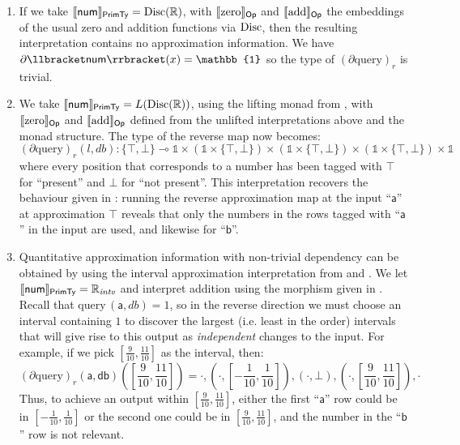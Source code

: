 \begin{enumerate}
\item If we take $\llbracket \mathsf{num} \rrbracket_{\mathsf{PrimTy}} = \mathrm{Disc}(\mathbb{R})$, with $\llbracket \mathrm{zero} \rrbracket_{\mathsf{Op}}$ and
  $\llbracket \mathrm{add} \rrbracket_{\mathsf{Op}}$ the embeddings of the usual zero and addition functions via $\mathrm{Disc}$, then the
  resulting interpretation contains no approximation information. We have
  $\partial\sem{\mathsf{num}}(x) = \mathbb{1}$ so the type of $(\partial \mathrm{query})_r$ is trivial.
\item We take $\llbracket \mathsf{num} \rrbracket_{\mathsf{PrimTy}} = L(\mathrm{Disc}(\mathbb{R}))$, using the lifting monad from
  , with $\llbracket \mathrm{zero} \rrbracket_{\mathsf{Op}}$ and
  $\llbracket \mathrm{add} \rrbracket_{\mathsf{Op}}$ defined from the unlifted interpretations above and the monad structure. The
  type of the reverse map now becomes:
  \begin{displaymath}
    (\partial \mathrm{query})_r(l, \mathit{db}) : \{\top,\bot\} \multimap \mathbb{1} \times (\mathbb{1} \times \{\top,\bot\}) \times (\mathbb{1} \times \{\top,\bot\}) \times (\mathbb{1} \times \{\top,\bot\}) \times \mathbb{1}
  \end{displaymath}
  where every position that corresponds to a number has been tagged with $\top$ for ``present'' and $\bot$ for
  ``not present''. This interpretation recovers the behaviour given in : running
  the reverse approximation map at the input ``$\mathsf{a}$'' at approximation $\top$ reveals that only the
  numbers in the rows tagged with ``$\mathsf{a}$'' in the input are used, and likewise for ``$\mathsf{b}$''.
\item Quantitative approximation information with non-trivial dependency can be obtained by using the interval
  approximation interpretation from  and . We let
  $\llbracket \mathsf{num} \rrbracket_{\mathsf{PrimTy}} = \mathbb{R}_{\mathit{intv}}$ and interpret addition using the morphism given
  in . Recall that $\mathrm{query}\,(\mathsf{a},\mathit{db}) = 1$, so in the reverse
  direction we must choose an interval containing $1$ to discover the largest (i.e. least in the order)
  intervals that will give rise to this output as \emph{independent} changes to the input. For example, if we
  pick $[\frac{9}{10},\frac{11}{10}]$ as the interval, then:
  \begin{displaymath}
    (\partial\mathrm{query})_r(\mathsf{a},\mathsf{db})([\frac{9}{10},\frac{11}{10}]) = \cdot, (\cdot,[-\frac{1}{10},\frac{1}{10}]),(\cdot,\bot),(\cdot,[\frac{9}{10},\frac{11}{10}]), \cdot
  \end{displaymath}
  Thus, to achieve an output within $[\frac{9}{10},\frac{11}{10}]$, either the first ``$\mathsf{a}$'' row
  could be in $[-\frac{1}{10},\frac{1}{10}]$ or the second one could be in $[\frac{9}{10},\frac{11}{10}]$, and
  the number in the ``$\mathsf{b}$'' row is not relevant.
\end{enumerate}

